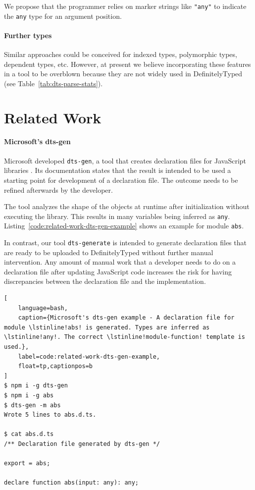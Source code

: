 \documentclass[english,cleveref,autoref,submission]{programming}
\newcommand{\coderef}[1]{Listing~\ref{#1}}
\begin{document}
We propose that the programmer relies on marker strings like \lstinline/"any"/ to indicate
the \lstinline/any/ type for an argument position.

\paragraph*{Further types}
Similar approaches could be conceived for indexed types, polymorphic types, dependent
types, etc. However, at present we believe incorporating these features in a tool to be
overblown because they are not widely used in DefinitelyTyped (see
Table~\ref{tab:dts-parse-stats}). 

\section{Related Work}
\label{sec:related-work}
\paragraph*{Microsoft's dts-gen}
Microsoft developed \texttt{dts-gen}, a tool that creates declaration files for
JavaScript libraries \cite{dts-gen}. Its documentation states that the result is 
intended to be used a starting point for development of a declaration file. The outcome
needs to be refined afterwards by the developer. 

The tool analyzes the shape of the objects at runtime after initialization without
executing the library. This results in many variables being inferred as
\lstinline[language={}]{any}. \coderef{code:related-work-dts-gen-example} shows an example
for module \lstinline[language={}]{abs}. 

In contrast, our tool \texttt{dts-generate} is intended to generate declaration files
that are ready to be uploaded to DefinitelyTyped without further manual intervention. Any
amount of manual work that a developer needs to do on a declaration file after updating
JavaScript code increases the risk for having discrepancies between the declaration file
and the implementation.


\begin{lstlisting}[
    language=bash,
    caption={Microsoft's dts-gen example - A declaration file for module \lstinline!abs! is generated. Types are inferred as \lstinline!any!. The correct \lstinline!module-function! template is used.},
	label=code:related-work-dts-gen-example,
    float=tp,captionpos=b
]
$ npm i -g dts-gen
$ npm i -g abs
$ dts-gen -m abs
Wrote 5 lines to abs.d.ts.

$ cat abs.d.ts
/** Declaration file generated by dts-gen */

export = abs;

declare function abs(input: any): any;
\end{lstlisting}
\end{document}
